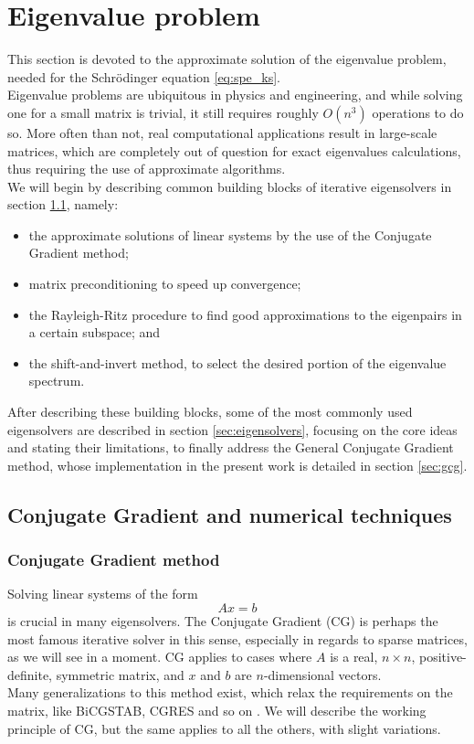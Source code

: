 \section{Eigenvalue problem}
This section is devoted to the approximate solution of the eigenvalue problem, needed for the Schr\"odinger equation \eqref{eq:spe_ks}. 
\\Eigenvalue problems are ubiquitous in physics and engineering, and while solving one for a small matrix is trivial, it still requires roughly $O(n^3)$ operations \cite{golub13} to do so. More often than not, real computational applications result in large-scale matrices, which are completely out of question for exact eigenvalues calculations, thus requiring the use of approximate algorithms. 
\\We will begin by describing common building blocks of iterative eigensolvers in section \ref{sec:techniques}, namely:
\begin{itemize}
    \item the approximate solutions of linear systems by the use of the Conjugate Gradient method;
    \item matrix preconditioning to speed up convergence;
    \item the Rayleigh-Ritz procedure to find good approximations to the eigenpairs in a certain subspace; and
    \item the shift-and-invert method, to select the desired portion of the eigenvalue spectrum.
\end{itemize}
After describing these building blocks, some of the most commonly used eigensolvers are described in section \ref{sec:eigensolvers}, focusing on the core ideas and stating their limitations, to finally address the General Conjugate Gradient method, whose implementation in the present work is detailed in section \ref{sec:gcg}.
\subsection{Conjugate Gradient and numerical techniques}
\label{sec:techniques}
\subsubsection{Conjugate Gradient method}
\label{sec:cg}
Solving linear systems of the form
\begin{equation}
    \label{eq:lin_sys}
    Ax = b
\end{equation}
is crucial in many eigensolvers. The Conjugate Gradient (CG) is perhaps the most famous iterative solver in this sense, especially in regards to sparse matrices, as we will see in a moment.
CG applies to cases where $A$ is a real, $n\times n$, positive-definite, symmetric matrix, and $x$ and $b$ are $n$-dimensional vectors.
\\Many generalizations to this method exist, which relax the requirements on the matrix, like BiCGSTAB, CGRES and so on \cite{Saad1992}. We will describe the working principle of CG, but the same applies to all the others, with slight variations.
